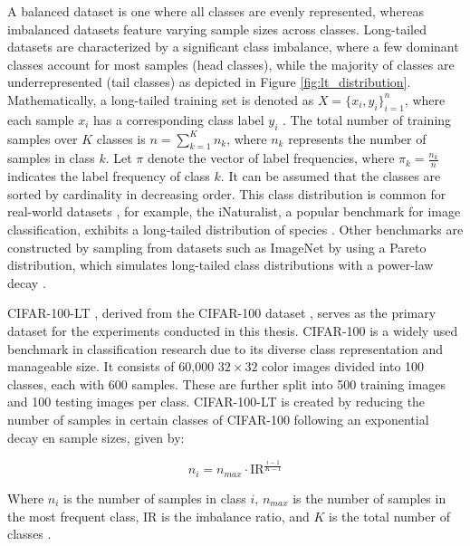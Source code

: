 \noindent A balanced dataset is one where all classes are evenly represented, whereas imbalanced datasets feature varying sample sizes across classes. Long-tailed datasets are characterized by a significant class imbalance, where a few dominant classes account for most samples (head classes), while the majority of classes are underrepresented (tail classes) as depicted in Figure \ref{fig:lt_distribution}. Mathematically, a long-tailed training set is denoted as $X=\{x_i, y_i\}_{i=1}^n$, where each sample $x_i$ has a corresponding class label $y_i$ \cite{zhang2023deep}. The total number of training samples over $K$ classes is $n = \sum_{k=1}^K n_k$, where $n_k$ represents the number of samples in class $k$. Let $\pi$ denote the vector of label frequencies, where $\pi_k = \frac{n_k}{n}$ indicates the label frequency of class $k$. It can be assumed that the classes are sorted by cardinality in decreasing order. This class distribution is common for real-world datasets \cite{Newman_2005, liu2019largescalelongtailedrecognitionopen}, for example, the iNaturalist, a popular benchmark for image classification, exhibits a long-tailed distribution of species \cite{vanhorn2018inaturalistspeciesclassificationdetection}. Other benchmarks are constructed by sampling from datasets such as ImageNet \cite{ImageNet2009} by using a Pareto distribution, which simulates long-tailed class distributions with a power-law decay \cite{zhang2023deep, dealvis2024surveydeeplongtailclassification,cao2019learningimbalanceddatasetslabeldistributionaware}.

CIFAR-100-LT \cite{cao2019learningimbalanceddatasetslabeldistributionaware}, derived from the CIFAR-100 dataset \cite{krizhevsky2009learning}, serves as the primary dataset for the experiments conducted in this thesis. CIFAR-100 is a widely used benchmark in classification research due to its diverse class representation and manageable size. It consists of 60,000 $32 \times 32$ color images divided into 100 classes, each with 600 samples. These are further split into 500 training images and 100 testing images per class. CIFAR-100-LT is created by reducing the number of samples in certain classes of CIFAR-100 following an exponential decay en sample sizes, given by:

\begin{equation}
    \label{eq:exp}
    n_i = n_{max}\cdot \text{IR}^{\frac{i-1}{K-1}}
\end{equation}

Where $n_i$ is the number of samples in class $i$, $n_{max}$ is the number of samples in the most frequent class, IR is the imbalance ratio, and $K$ is the total number of classes \cite{cao2019learningimbalanceddatasetslabeldistributionaware}.

